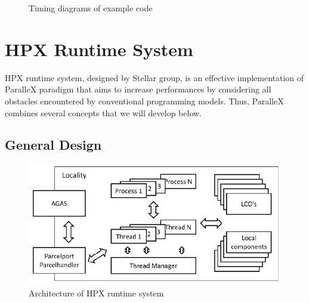 \documentclass[smallextended]{svjour3}
\begin{document}
\begin{figure}[h]
	\centering
	\hspace{0.5cm}
	\caption{Timing diagrams of example code}
	\label{chronofuture}
\end{figure}

\section{HPX Runtime System}\label{HPX}
HPX runtime system, designed by Stellar group, is an effective implementation of ParalleX paradigm that aims to increase performances by considering all obstacles encountered by conventional programming models. Thus, ParalleX combines several concepts that we will develop below.

\subsection{General Design}

\begin{figure}[h]
\begin{center}
\includegraphics[scale=0.55]{Images/Im4.jpeg}
\end{center}
\caption{Architecture of HPX runtime system}
\label{ArchiHPX}
\end{figure}
\end{document}
